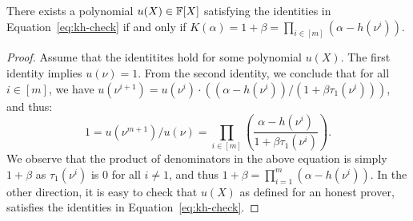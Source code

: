 \begin{lemma}\label{lem:kh-check}
There exists a polynomial $u(X)\in \mathbb{F}[X]$ satisfying the identities in Equation~\eqref{eq:kh-check}
if and only if $K(\alpha)=1+\beta=\prod_{i\in [m]} (\alpha - h(\nu^i))$.
\end{lemma}
\begin{proof}
    Assume that the identitites hold for some polynomial $u(X)$.
    The first identity implies $u(\nu)=1$. From the second identity, we conclude that for all $i\in [m]$, we have
    $u(\nu^{i+1})=u(\nu^i)\cdot ((\alpha - h(\nu^i))/(1+\beta \tau_1(\nu^i)))$, and thus:
    $$1 = u(\nu^{m+1})/u(\nu) = \prod_{i\in [m]}\left(\frac{\alpha - h(\nu^i)}{1+\beta \tau_1(\nu^i)}\right).$$
    We observe that the product of denominators in the above equation is simply $1+\beta$ as $\tau_1(\nu^i)$
    is $0$ for all $i\neq 1$, and thus $1+\beta = \prod_{i=1}^m (\alpha - h(\nu^i))$. In the other direction,
    it is easy to check that $u(X)$ as defined for an honest prover, satisfies the identities in Equation~\ref{eq:kh-check}.
\end{proof}

